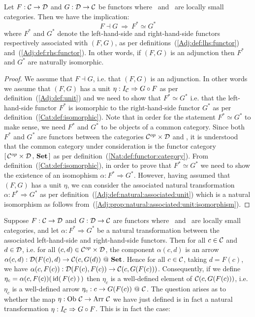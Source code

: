 \begin{prop}\label{Adj:prop:adjunction:F*:G*:iso}
    Let $F:\mbox{$\cal C$}\to\mbox{$\cal D$}$ and $G:\mbox{$\cal D$}\to\mbox{$\cal C$}$ be functors where \Cat\ and \Dat\ 
    are locally small categories. Then we have the implication:
        \[
            F\dashv G\ \Rightarrow\  F^{*}\simeq G^{*}
        \]
    where $F^{*}$ and $G^{*}$ denote the left-hand-side and right-hand-side 
    functors respectively associated with $(F,G)$, as per 
    definitions~(\ref{Adj:def:lhs:functor}) and~(\ref{Adj:def:rhs:functor}). 
    In other words, if $(F,G)$ is an adjunction then $F^{*}$ and $G^{*}$ are 
    naturally isomorphic.
\end{prop}
\begin{proof}
    We assume that $F\dashv G$, i.e. that $(F,G)$ is an adjunction. In other
    words we assume that $(F,G)$ has a unit $\eta:I_{\cal C}\Rightarrow G\circ F$
    as per definition~(\ref{Adj:def:unit}) and we need to show that 
    $F^{*}\simeq G^{*}$ i.e. that the left-hand-side functor $F^{*}$ is 
    isomorphic to the right-hand-side functor $G^{*}$ as per
    definition~(\ref{Cat:def:isomorphic}). Note that in order for the 
    statement $F^{*}\simeq G^{*}$ to make sense, we need $F^{*}$ and $G^{*}$
    to be objects of a common category. Since both $F^{*}$ and $G^{*}$ are
    functors between the categories $\mbox{${\cal C}^{op}$}\times\mbox{$\cal D$}$ and \Set, it is 
    understood that the common category under consideration is the functor
    category $[\,\mbox{${\cal C}^{op}$}\times\mbox{$\cal D$}\,,\,\mbox{\bf Set}\,]$ as per 
    definition~(\ref{Nat:def:functor:category}). From 
    definition~(\ref{Cat:def:isomorphic}), in order to prove that $F^{*}\simeq 
    G^{*}$ we need to show the existence of an isomophism $\alpha:F^{*}
    \Rightarrow G^{*}$. However, having assumed that $(F,G)$ has a unit $\eta$,
    we can consider the associated natural transformation $\alpha : F^{*}
    \Rightarrow G^{*}$ as per definition~(\ref{Adj:def:natural:associated:unit})
    which is a natural isomorphism as follows 
    from~(\ref{Adj:prop:natural:associated:unit:isomorphism}).
\end{proof}

Suppose $F:\mbox{$\cal C$}\to\mbox{$\cal D$}$ and $G:\mbox{$\cal D$}\to\mbox{$\cal C$}$ are functors where \Cat\ and \Dat\ 
are locally small categories, and let $\alpha:F^{*}\Rightarrow G^{*}$ be a 
natural transformation between the associated left-hand-side and right-hand-side
functors. Then for all $c\in\mbox{$\cal C$}$ and $d\in\mbox{$\cal D$}$, i.e. for all $(c,d)\in
\mbox{${\cal C}^{op}$}\times\mbox{$\cal D$}$, the component $\alpha(c,d)$ is an arrow
$\alpha(c,d):\Dat(F(c),d)\to\Cat(c,G(d))\ @\ \Set$. Hence for all $c\in\mbox{$\cal C$}$,
taking $d=F(c)$, we have $\alpha(c,F(c)):\mbox{$\cal D$}(F(c),F(c))\to\mbox{$\cal C$}(c,G(F(c)))$.
Consequently, if we define $\eta_{c}=\alpha(c,F(c))(\,\mbox{\rm id}(\,F(c)\,)\,)$ then
$\eta_{c}$ is a well-defined element of $\mbox{$\cal C$}(c,G(F(c)))$, i.e.
$\eta_{c}$ is a well-defined arrow $\eta_{c}:c\to G(F(c))\ @\ \mbox{$\cal C$}$. The question
arises as to whether the map $\eta:\mbox{\rm Ob}\ \mbox{$\cal C$}\to\mbox{\rm Arr}\ \mbox{$\cal C$}$ we have just defined
is in fact a natural transformation $\eta:I_{\cal C}\Rightarrow G\circ F$.
This is in fact the case:

